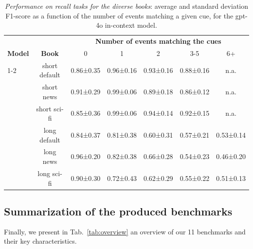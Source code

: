 \documentclass{article}
\begin{document}
\begin{table}[t]
\caption{\textit{Performance on recall tasks for the diverse books}: average and standard deviation F1-score as a function of the number of events matching a given cue, for the gpt-4o in-context model.}
\centering
\label{tab:results_200_get_all_questions_diverse}
\begin{tabular}{@{}lcccccc@{}}
\toprule
 &   & \multicolumn{5}{c}{\bf Number of events matching the cues }  \\
 \bf Model & \bf Book & 0 & 1 & 2 & 3-5 & 6+ \\ \cmidrule{1-2}\cmidrule{3-7}
\multirow{6}{*}{gpt-4o} & short default & 0.86±0.35 & 0.96±0.16 & 0.93±0.16 & 0.88±0.16 & n.a. \\
 & short news &0.91±0.29 & 0.99±0.06 & 0.89±0.18 & 0.86±0.12 & n.a. \\
  & short sci-fi & 0.85±0.36 & 0.99±0.06 & 0.94±0.14 & 0.92±0.15 & n.a. \\
  & long default & 0.84±0.37 & 0.81±0.38 & 0.60±0.31 & 0.57±0.21 & 0.53±0.14 \\
  & long news & 0.96±0.20 & 0.82±0.38 & 0.66±0.28 & 0.54±0.23 & 0.46±0.20 \\ 
  & long sci-fi & 0.90±0.30 & 0.72±0.43 & 0.62±0.29 & 0.55±0.22 & 0.51±0.13 \\ \bottomrule
\end{tabular}
\end{table}

\subsection{Summarization of the produced benchmarks}

Finally, we present in Tab.~\ref{tab:overview} an overview of our 11 benchmarks and their key characteristics.
\end{document}
